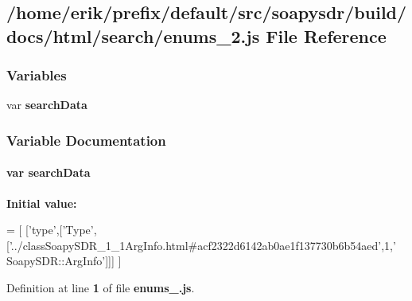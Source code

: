 \subsection{/home/erik/prefix/default/src/soapysdr/build/docs/html/search/enums\+\_\+2.js File Reference}
\label{enums__2_8js}
\subsubsection*{Variables}
\begin{DoxyCompactItemize}
\item 
var {\bf search\+Data}
\end{DoxyCompactItemize}


\subsubsection{Variable Documentation}
\paragraph[{search\+Data}]{\setlength{\rightskip}{0pt plus 5cm}var search\+Data}\label{enums__2_8js_ad01a7523f103d6242ef9b0451861231e}
{\bfseries Initial value\+:}
\begin{DoxyCode}
=
[
  [\textcolor{stringliteral}{'type'},[\textcolor{stringliteral}{'Type'},[\textcolor{stringliteral}{'../classSoapySDR\_1\_1ArgInfo.html#acf2322d6142ab0ae1f137730b6b54aed'},1,\textcolor{stringliteral}{'
      SoapySDR::ArgInfo'}]]]
]
\end{DoxyCode}


Definition at line {\bf 1} of file {\bf enums\+\_.\+js}.

